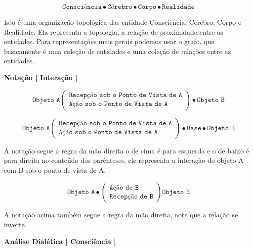 $$ \texttt{Consciência} \bullet \texttt{Cérebro} \bullet \texttt{Corpo} \bullet \texttt{Realidade} $$

Isto é uma organização topológica das entidade Consciência, Cérebro, Corpo e Realidade. Ela representa a topologia, a relação de proximidade entre as entidades. Para representações mais gerais podemos usar o grafo, que basicamente é uma coleção de entidades e uma coleção de relações entre as entidades.

\hspace{\baselineskip}

\textbf{Notação [ Interação ]}

$$ \texttt{Objeto A}  \left( \begin{array}{c}
\texttt{Recepção sob o Ponto de Vista de A} \\ \texttt{Ação sob o Ponto de Vista de A}
\end{array} \right) \bullet \texttt{Objeto B} $$

$$ \texttt{Objeto A}  \left( \begin{array}{c}
\texttt{Recepção sob o Ponto de Vista de A} \\ \texttt{Ação sob o Ponto de Vista de A}
\end{array} \right) \bullet \texttt{Base} \bullet \texttt{Objeto B} $$

A notação segue a regra da mão direita o de cima é para esquerda e o de baixo é para direita no conteúdo dos parênteses, ele representa a interação do objeto A com B sob o ponto de vista de A.

$$ \texttt{Objeto A} \bullet \left( \begin{array}{cc}
\texttt{Ação de B} \\ \texttt{Recepção de B}
\end{array} \right) \texttt{Objeto B}  $$

A notação acima também segue a regra da mão direita, note que a relação se inverte.

\hspace{\baselineskip}

\textbf{Análise Dialética [ Consciência ]}

